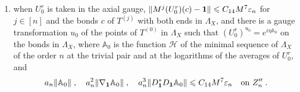 \documentclass[11pt]{preprint}
\newcommand{\id}{\mathbf 1}
\DeclarePairedDelimiter{\norm}{\lVert}{\rVert}
\numberwithin{equation}{section}
\begin{document}
\begin{proposition}
\begin{enumerate}[label=(\roman*)]
\item when $U^r_0$ is taken in the axial gauge, $\norm{M^j(U^r_0)(c) - \id} \leqslant C_{14}M^7\varepsilon_n$ for $j \in [n]$ and the bonds $c$ of $T^{(j)}$ with both ends in $\Lambda_X$, and there is a gauge transformation $u_0$ of the points of $T^{(0)}$ in $\Lambda_X$ such that $(U^r_0)^{u_0} = e^{i\eta\mathbb A_0}$ on the bonds in $\Lambda_X$, where $\mathbb A_0$ is the function $\mathcal H$ of the minimal sequence of $\Lambda_X$ of the order $n$ at the trivial pair and at the logarithms of the averages of $U^r_0$, and
\begin{equation}\label{eq:box-landau}
    a_n\norm{\mathbb A_0}\;,\quad
    a_n^2\norm{\nabla_{\id}\mathbb A_0}\;,\quad
    a_n^3\norm{D^*_{\id}D_{\id}\mathbb A_0} \leqslant C_{14}M^7\varepsilon_n
    \quad\text{on } Z''_n\;.
\end{equation}
\end{enumerate}
\end{proposition}
\end{document}
